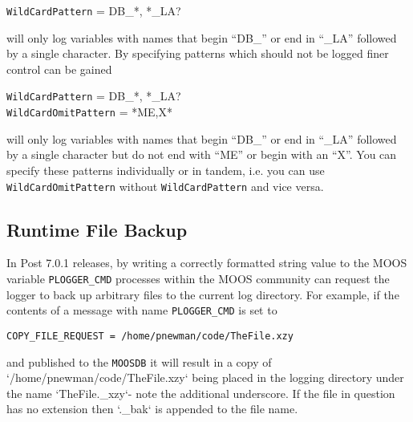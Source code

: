 \documentclass[a4paper,10pt]{article}
\newcommand{\Code}[1]{\texttt{#1} }
\newcommand{\code}[1]{\Code{#1} }
\newcommand{\DB}   {\code{{MOOSDB}}}
\begin{document}
\begin{center}
\code{WildCardPattern} =  DB\_*, *\_LA?
\end{center}

will only log variables with names that begin ``DB\_'' or end in ``\_LA'' followed by a single character. By specifying patterns which should not be logged finer control can be gained

\begin{center}
\code{WildCardPattern} =  DB\_*, *\_LA? \\
\code{WildCardOmitPattern} =  *ME,X*
\end{center}

will only log variables with names that  begin ``DB\_'' or end in ``\_LA'' followed by a single character but do not end with ``ME'' or begin with an ``X''. You can specify these patterns individually or  in tandem, i.e. you can use \code{WildCardOmitPattern}  without \code{WildCardPattern}  and vice versa.


\subsection{Runtime File Backup}
In Post 7.0.1 releases, by writing a correctly formatted string value to the MOOS variable \code{PLOGGER\_CMD} processes within the MOOS community can request the logger to back up arbitrary files to the current log directory. For example, if the contents of a message with name \code{PLOGGER\_CMD} is set to
\begin{center}
\code{COPY\_FILE\_REQUEST = /home/pnewman/code/TheFile.xzy}
\end{center}
 and published to the \DB  it will result in a copy of `/home/pnewman/code/TheFile.xzy` being placed in the logging directory under the name `TheFile.\_xzy`- note the additional underscore. If the file in question has no extension then `.\_bak` is appended to the file name.
\end{document}
